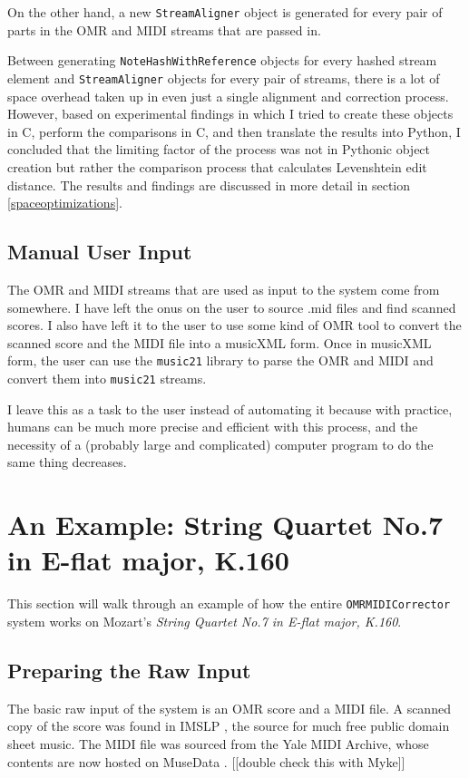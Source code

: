 On the other hand, a new \texttt{StreamAligner} object is generated for every pair of parts in the OMR and MIDI streams that are passed in. 

Between generating \texttt{NoteHashWithReference} objects for every hashed stream element and \texttt{StreamAligner} objects for every pair of streams, there is a lot of space overhead taken up in even just a single alignment and correction process. However, based on experimental findings in which I tried to create these objects in C, perform the comparisons in C, and then translate the results into Python, I concluded that the limiting factor of the process was not in Pythonic object creation but rather the comparison process that calculates Levenshtein edit distance. The results and findings are discussed in more detail in section \ref{spaceoptimizations}.


\subsection{Manual User Input}
The OMR and MIDI streams that are used as input to the system come from somewhere. I have left the onus on the user to source .mid files and find scanned scores. I also have left it to the user to use some kind of OMR tool to convert the scanned score and the MIDI file into a musicXML form. Once in musicXML form, the user can use the \texttt{music21} library to parse the OMR and MIDI and convert them into \texttt{music21} streams. 

I leave this as a task to the user instead of automating it because with practice, humans can be much more precise and efficient with this process, and the necessity of a (probably large and complicated) computer program to do the same thing decreases. 

\section{An Example: String Quartet No.7 in E-flat major, K.160}
This section will walk through an example of how the entire \texttt{OMRMIDICorrector} system works on Mozart's \textit{String Quartet No.7 in E-flat major, K.160}.

\subsection{Preparing the Raw Input}
The basic raw input of the system is an OMR score and a MIDI file. A scanned copy of the score was found in IMSLP \cite{k160}, the source for much free public domain sheet music. The MIDI file was sourced from the Yale MIDI Archive\cite{yalemidiarchive}, whose contents are now hosted on MuseData \cite{musedata}. [[double check this with Myke]]

